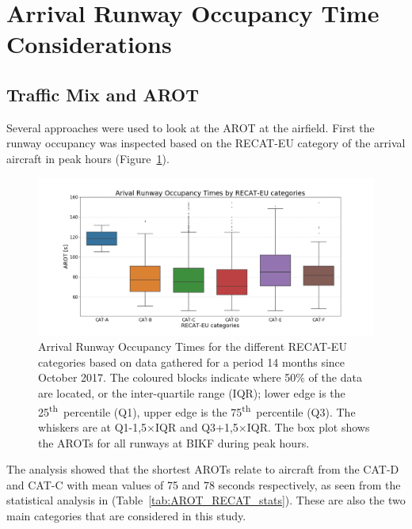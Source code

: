 \section{Arrival Runway Occupancy Time Considerations}\label{sec:AROT_considerations} 

\subsection{Traffic Mix and AROT\label{ssec:mix_effect_arot}}

Several approaches were used to look at the AROT at the airfield. First the runway occupancy was inspected based on the RECAT-EU category of the arrival aircraft in peak hours (Figure~\ref{fig:RECAT_AROTs_boxplot}).

\begin{figure}[h]
    \centering
    \includegraphics[width=1\textwidth]{graphics/fig_RECAT_AROTs_boxplot.png}
    \caption[AROTs box-plot for RECAT-EU categories, all runways]{Arrival Runway Occupancy Times for the different RECAT-EU categories based on data gathered for a period 14 months since October 2017. The coloured blocks indicate where 50\% of the data are located, or the inter-quartile range (IQR); lower edge is the 25\textsuperscript{th}~percentile (Q1), upper edge is the 75\textsuperscript{th}~percentile (Q3). The whiskers are at Q1-1,5$\times$IQR and Q3+1,5$\times$IQR.  The box plot shows the AROTs for all runways at BIKF during peak hours.}
    \label{fig:RECAT_AROTs_boxplot}
\end{figure}

The analysis showed that the shortest AROTs relate to aircraft from the CAT-D and CAT-C with mean values of 75 and 78 seconds respectively, as seen from the statistical analysis in (Table~\ref{tab:AROT_RECAT_stats}). These are also the two main categories that are considered in this study.


